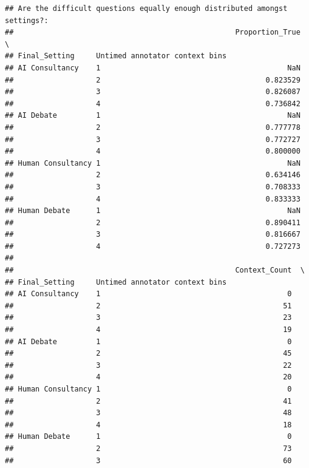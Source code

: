\documentclass[
]{article}
\begin{document}
\begin{verbatim}
## Are the difficult questions equally enough distributed amongst settings?:
##                                                   Proportion_True  \
## Final_Setting     Untimed annotator context bins                    
## AI Consultancy    1                                           NaN   
##                   2                                      0.823529   
##                   3                                      0.826087   
##                   4                                      0.736842   
## AI Debate         1                                           NaN   
##                   2                                      0.777778   
##                   3                                      0.772727   
##                   4                                      0.800000   
## Human Consultancy 1                                           NaN   
##                   2                                      0.634146   
##                   3                                      0.708333   
##                   4                                      0.833333   
## Human Debate      1                                           NaN   
##                   2                                      0.890411   
##                   3                                      0.816667   
##                   4                                      0.727273   
## 
##                                                   Context_Count  \
## Final_Setting     Untimed annotator context bins                  
## AI Consultancy    1                                           0   
##                   2                                          51   
##                   3                                          23   
##                   4                                          19   
## AI Debate         1                                           0   
##                   2                                          45   
##                   3                                          22   
##                   4                                          20   
## Human Consultancy 1                                           0   
##                   2                                          41   
##                   3                                          48   
##                   4                                          18   
## Human Debate      1                                           0   
##                   2                                          73   
##                   3                                          60   

\end{verbatim}
\end{document}
